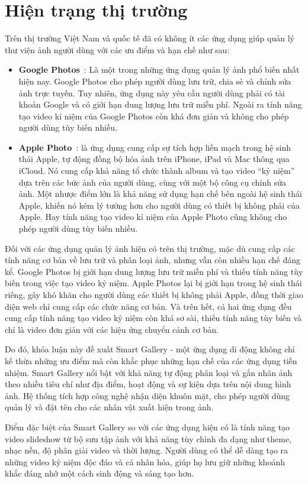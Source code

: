 \section{Hiện trạng thị trường} 
Trên thị trường Việt Nam và quốc tế đã có không ít các ứng dụng giúp quản lý thư viện ảnh người dùng với các ưu điểm và hạn chế như sau:
\begin{itemize}
    \item \textbf{Google Photos}~\cite{googlephoto}: Là một trong những ứng dụng quản lý ảnh phổ biến nhất hiện nay. Google Photos cho phép người dùng lưu trữ, chia sẻ và chỉnh sửa ảnh trực tuyến. Tuy nhiên, ứng dụng này yêu cầu người dùng phải có tài khoản Google và có giới hạn dung lượng lưu trữ miễn phí. Ngoài ra tính năng tạo video kỉ niệm của Google Photos còn khá đơn giản và không cho phép người dùng tùy biến nhiều.
    \item \textbf{Apple Photo}~\cite{applephoto}: là ứng dụng cung cấp sự tích hợp liền mạch trong hệ sinh thái Apple, tự động đồng bộ hóa ảnh trên iPhone, iPad và Mac thông qua iCloud. Nó cung cấp khả năng tổ chức thành album và tạo video ``kỷ niệm'' dựa trên các bức ảnh của người dùng, cùng với một bộ công cụ chỉnh sửa ảnh. Một nhược điểm lớn là khả năng sử dụng hạn chế bên ngoài hệ sinh thái Apple, khiến nó kém lý tưởng hơn cho người dùng có thiết bị không phải của Apple. Hay tính năng tạo video kỉ niệm của Apple Photo cũng không cho phép người dùng tùy biến nhiều.
\end{itemize}

Đối với các ứng dụng quản lý ảnh hiện có trên thị trường, mặc dù cung cấp các tính năng cơ bản về lưu trữ và phân loại ảnh, nhưng vẫn còn nhiều hạn chế đáng kể. Google Photos bị giới hạn dung lượng lưu trữ miễn phí và thiếu tính năng tùy biến trong việc tạo video kỷ niệm. Apple Photos lại bị giới hạn trong hệ sinh thái riêng, gây khó khăn cho người dùng các thiết bị không phải Apple, đồng thời giao diện web chỉ cung cấp các chức năng cơ bản. Và trên hết, cả hai ứng dụng đều cung cấp tính năng tạo video kỷ niệm còn khá sơ sài, thiếu tính năng tùy biến và chỉ là video đơn giản với các hiệu ứng chuyển cảnh cơ bản.

Do đó, khóa luận này đề xuất Smart Gallery - một ứng dụng di động không chỉ kế thừa những ưu điểm mà còn khắc phục những hạn chế của các ứng dụng tiền nhiệm. Smart Gallery nổi bật với khả năng tự động phân loại và gắn nhãn ảnh theo nhiều tiêu chí như địa điểm, hoạt động và sự kiện dựa trên nội dung hình ảnh. Hệ thống tích hợp công nghệ nhận diện khuôn mặt, cho phép người dùng quản lý và đặt tên cho các nhân vật xuất hiện trong ảnh. 

Điểm đặc biệt của Smart Gallery so với các ứng dụng hiện có là tính năng tạo video slideshow từ bộ sưu tập ảnh với khả năng tùy chỉnh đa dạng như theme, nhạc nền, độ phân giải video và thời lượng. Người dùng có thể dễ dàng tạo ra những video kỷ niệm độc đáo và cá nhân hóa, giúp họ lưu giữ những khoảnh khắc đáng nhớ một cách sinh động và sáng tạo hơn. 